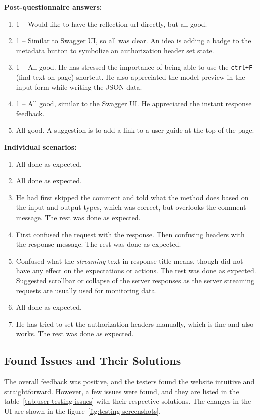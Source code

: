 \textbf{Post-questionnaire answers:}
\begin{enumerate}
    \item 1 -- Would like to have the reflection url directly, but all good.
    \item 1 -- Similar to Swagger UI, so all was clear.
    An idea is adding a badge to the metadata button to symbolize an authorization header set state.
    \item 1 -- All good.
    He has stressed the importance of being able to use the \verb|ctrl+F| (find text on page) shortcut.
    He also appreciated the model preview in the input form while writing the JSON data.
    \item 1 -- All good, similar to the Swagger UI\@.
    He appreciated the instant response feedback.
    \item All good.
    A suggestion is to add a link to a user guide at the top of the page.
\end{enumerate}

\textbf{Individual scenarios:}
\begin{enumerate}
    \item All done as expected.
    \item All done as expected.
    \item He had first skipped the comment and told what the method does based on the input and output types, which was correct, but overlooks the comment message.
    The rest was done as expected.
    \item First confused the request with the response.
    Then confusing headers with the response message.
    The rest was done as expected.
    \item Confused what the \textit{streaming} text in response title means, though did not have any effect on the expectations or actions.
    The rest was done as expected.
    Suggested scrollbar or collapse of the server responses as the server streaming requests are usually used for monitoring data.
    \item All done as expected.
    \item He has tried to set the authorization headers manually, which is fine and also works.
    The rest was done as expected.
\end{enumerate}

\subsection{Found Issues and Their Solutions}\label{subsec:found-issues-and-their-solutions}
The overall feedback was positive, and the testers found the website intuitive and straightforward.
However, a few issues were found, and they are listed in the table~\ref{tab:user-testing-issues} with their respective solutions.
The changes in the UI are shown in the figure~\ref{fig:testing-screenshots}.

